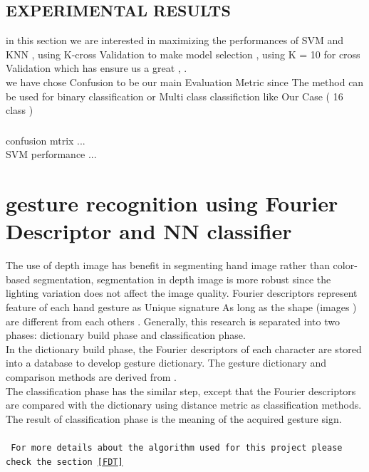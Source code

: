 \subsection{EXPERIMENTAL RESULTS }
in this section we are interested in maximizing the performances of SVM and KNN , using K-cross Validation to make model selection , using K = 10 for cross Validation which has ensure us a great    ,  . \\
we have chose Confusion to be our main Evaluation Metric since The method can be used for binary classification or Multi class classifiction like Our Case ( 16 class ) 

\subsubsection{ } 

confusion mtrix ...\\
SVM performance ...

\newpage





\section{gesture recognition using Fourier Descriptor and NN  classifier }

 The use of depth image has benefit
in segmenting hand image rather than color-based
segmentation, segmentation in depth image is more robust
since the lighting variation does not affect the image quality.
 Fourier descriptors represent feature of each hand gesture as Unique signature As long as the shape (images ) are different from each others .
Generally, this research is separated into two phases:
dictionary build phase and classification phase. \\In the
dictionary build phase, the Fourier descriptors of each
character are stored into a database to develop gesture
dictionary. The gesture dictionary and comparison methods are
derived from \cite{clif}.\\ The classification phase has the similar
step, except that the Fourier descriptors are compared with the
dictionary using distance metric as classification methods.
The result of classification phase is the meaning of the
acquired gesture sign.\\\\
\texttt{
For more details about the algorithm used for this project please check the section \ref{FDT}
}

